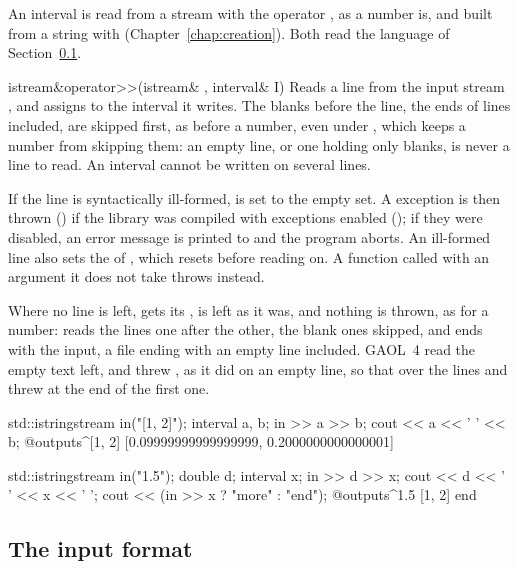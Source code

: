 \documentclass[12pt,a4paper,twoside,openright]{book}
\begin{document}
An interval is read from a stream with the operator \code{>{}>}, as a number
is, and built from a string with 
(Chapter~\ref{chap:creation}). Both read the language of
Section~\ref{sec:input-format}.
%

\begin{deffun}{istream\&}{operator>{}>}{(istream\& , interval\& I)}
  Reads a line from the input stream , and assigns to  the
  interval it writes. The blanks before the line, the ends of lines
  included, are skipped first, as before a number, even under
  , which keeps a number from skipping them: an empty
  line, or one holding only blanks, is never a line to read. An interval
  cannot be written on several lines.

  If the line is syntactically ill-formed,  is set to the empty set.
  A  exception is then thrown
  () if the library was compiled with exceptions
  enabled (); if they were disabled, an error
  message is printed to  and the program aborts. An ill-formed
  line also sets the  of , which 
  resets before reading on. A function called with an argument it does not
  take throws  instead.

  Where no line is left,  gets its ,  is left
  as it was, and nothing is thrown, as for a number: 
  reads the lines one after the other, the blank ones skipped, and ends with
  the input, a file ending with an empty line included.\newinvfive{} GAOL~4
  read the empty text left, and threw , as it did
  on an empty line, so that  over the lines
   and \code{[1, 2]} threw at the end of the first one.
\begin{example}
std::istringstream in("[1, 2]\n[0.1, 0.2]\n");
interval a, b;
in >> a >> b;
cout << a << ' ' << b;
@outputs^[1, 2] [0.09999999999999999, 0.2000000000000001]~
\end{example}
\begin{example}
std::istringstream in("1.5\n\n[1, 2]\n\n");
double d;
interval x;
in >> d >> x;
cout << d << ' ' << x << ' ';
cout << (in >> x ? "more" : "end");
@outputs^1.5 [1, 2] end~
\end{example}
\end{deffun}

\subsection{The input format}\label{sec:input-format}
\end{document}
